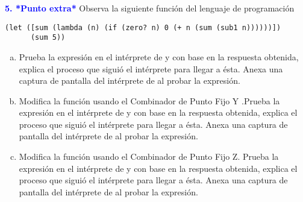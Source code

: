 \Large\textbf{\textcolor{blue}{5.  *Punto extra*}} 
Observa la siguiente función del lenguaje de programación 

\begin{lstlisting}
(let ([sum (lambda (n) (if (zero? n) 0 (+ n (sum (sub1 n))))))])
      (sum 5))
\end{lstlisting}

\begin{enumerate}[a.]
\item Prueba la expresión en el intérprete de  y con base en la respuesta 
obtenida, explica el proceso que siguió el intérprete para llegar a ésta. Anexa una 
captura de pantalla del intérprete de  al probar la expresión.
\item Modifica la función usando el Combinador de Punto Fijo Y .Prueba la expresión en 
el intérprete de  y con base en la respuesta obtenida, explica el proceso que 
siguió el intérprete para llegar a ésta. Anexa una captura de pantalla del intérprete 
de  al probar la expresión.
\item Modifica la función usando el Combinador de Punto Fijo Z. Prueba la expresión en 
el intérprete de  y con base en la respuesta obtenida, explica el proceso que 
siguió el intérprete para llegar a ésta. Anexa una captura de pantalla del intérprete 
de  al probar la expresión.
\end{enumerate}
